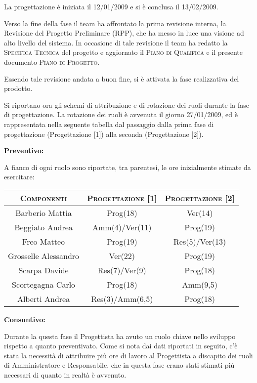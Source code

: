 \documentclass[11pt,a4paper]{article}
\begin{document}
La progettazione è iniziata il 12/01/2009 e si è conclusa il 13/02/2009.

Verso la fine della fase il team ha affrontato la prima revisione interna, la Revisione del Progetto Preliminare (RPP), che ha messo in luce una visione ad alto livello del sistema.
In occasione di tale revisione il team ha redatto la \textsc{Specifica Tecnica} del progetto e aggiornato il \textsc{Piano di Qualifica} e il presente documento \textsc{Piano di Progetto}.

Essendo tale revisione andata a buon fine, si è attivata la fase realizzativa del prodotto.

Si riportano ora gli schemi di attribuzione e di rotazione dei ruoli durante la fase di progettazione.
La rotazione dei ruoli è avvenuta il giorno 27/01/2009, ed è rappresentata nella seguente tabella dal passaggio dalla prima fase di progettazione (Progettazione [1]) alla seconda (Progettazione [2]).

\bigskip \bigskip
\begin{large}\textbf{Preventivo:}\end{large}
\newline
A fianco di ogni ruolo sono riportate, tra parentesi, le ore inizialmente stimate da esercitare:
\\
\begin{center}
\begin{tabular}{|c||c|c|}
\hline
\textsc{Componenti} & \textsc{Progettazione [1]} & \textsc{Progettazione [2]} \\ \hline \hline
Barberio Mattia & Prog(18) & Ver(14) \\ \hline
Beggiato Andrea & Amm(4)/Ver(11) & Prog(19) \\ \hline
Freo Matteo & Prog(19) & Res(5)/Ver(13) \\ \hline
Grosselle Alessandro & Ver(22) & Prog(19) \\ \hline
Scarpa Davide & Res(7)/Ver(9) & Prog(18) \\ \hline
Scortegagna Carlo & Prog(18) & Amm(9,5) \\ \hline
Alberti Andrea & Res(3)/Amm(6,5) & Prog(18) \\ \hline
\end{tabular}
\end{center}

\bigskip \bigskip
\begin{large}\textbf{Consuntivo:}\end{large}
\newline
Durante la questa fase il Progettista ha avuto un ruolo chiave nello sviluppo rispetto a quanto preventivato. Come si nota dai dati riportati in seguito, c'è stata la necessità di attribuire più ore di lavoro al Progettista a discapito dei ruoli di Amministratore e Responsabile, che in questa fase erano stati stimati più necessari di quanto in realtà è avvenuto.
\end{document}
